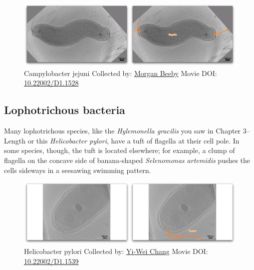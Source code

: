 \documentclass[]{tufte-book}
\begin{document}
\begin{figure}
\includegraphics{movie_stills/6_4} \caption[Campylobacter jejuni Collected by:
\protect\hyperlink{morgan_beeby}{Morgan Beeby} Movie DOI:
\href{https://doi.org/10.22002/D1.1528}{10.22002/D1.1528}]{Campylobacter jejuni Collected by:
\protect\hyperlink{morgan_beeby}{Morgan Beeby} Movie DOI:
\href{https://doi.org/10.22002/D1.1528}{10.22002/D1.1528}}\label{fig:6-4}
\end{figure}

\hypertarget{Lophotrichous_bacteria}{\subsection{Lophotrichous
bacteria}\label{Lophotrichous_bacteria}}

Many lophotrichous species, like the \emph{Hylemonella gracilis} you saw
in Chapter 3--Length or this \emph{Helicobacter pylori}, have a tuft of
flagella at their cell pole. In some species, though, the tuft is
located elsewhere; for example, a clump of flagella on the concave side
of banana-shaped \emph{Selenomonas artemidis} pushes the cells sideways
in a seesawing swimming pattern.





\begin{figure}
\includegraphics{movie_stills/6_4a} \caption[Helicobacter pylori Collected by:
\protect\hyperlink{yi-wei_chang}{Yi-Wei Chang} Movie DOI:
\href{https://doi.org/10.22002/D1.1539}{10.22002/D1.1539}]{Helicobacter pylori Collected by:
\protect\hyperlink{yi-wei_chang}{Yi-Wei Chang} Movie DOI:
\href{https://doi.org/10.22002/D1.1539}{10.22002/D1.1539}}\label{fig:6-4a}
\end{figure}
\end{document}
